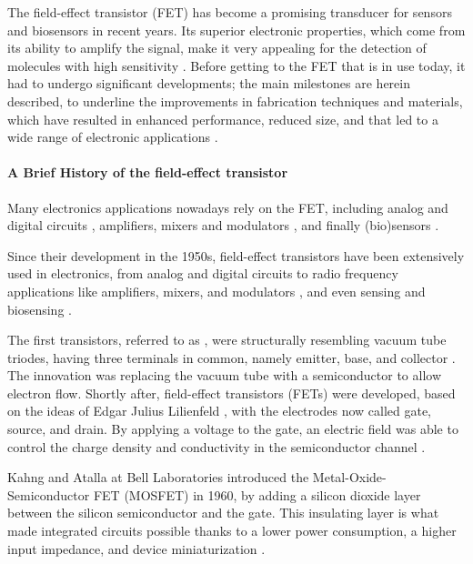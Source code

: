 The field-effect transistor (FET) has become a promising transducer for sensors and biosensors in recent years. Its superior electronic properties, which come from its ability to amplify the signal, make it very appealing for the detection of molecules with high sensitivity \citep{xuFlexible2022, yuRecent2024}. Before getting to the FET that is in use today, it had to undergo significant developments; the main milestones are herein described, to underline the improvements in fabrication techniques and materials, which have resulted in enhanced performance, reduced size, and that led to a wide range of electronic applications \citep{ahmadEvolution2021,tanAdvancements2024}.

\paragraph{A Brief History of the field-effect transistor}
Many electronics applications nowadays rely on the FET, including analog and digital circuits \citep{kimIntegrated2011, fortunatoOxide2012, yanRecent2022}, amplifiers, mixers and modulators \citep{torricelliIntegrated2021, yanRecent2022, pasadasExploiting2023}, and finally (bio)sensors \citep{shkodraElectrolytegated2021, dengSensors2022}.


Since their development in the 1950s, field-effect transistors have been extensively used in electronics, from analog and digital circuits \citep{kimIntegrated2011, fortunatoOxide2012, yanRecent2022} to radio frequency applications like amplifiers, mixers, and modulators \citep{torricelliIntegrated2021, yanRecent2022, pasadasExploiting2023}, and even sensing and biosensing \citep{shkodraElectrolytegated2021, dengSensors2022}.

The first transistors, referred to as , were structurally resembling vacuum tube triodes, having three terminals in common, namely emitter, base, and collector \citep{bardeenTransistor1948}. The innovation was replacing the vacuum tube with a semiconductor to allow electron flow. Shortly after, field-effect transistors (FETs) were developed, based on the ideas of Edgar Julius Lilienfeld \citep{edgarDevice1933, edgarMethod1930}, with the electrodes now called gate, source, and drain. By applying a voltage to the gate, an electric field was able to control the charge density and conductivity in the semiconductor channel \citep{shockleyUnipolar1952}.

Kahng and Atalla at Bell Laboratories introduced the Metal-Oxide-Semiconductor FET (MOSFET) in 1960, by adding a silicon dioxide layer between the silicon semiconductor and the gate. This insulating layer is what made integrated circuits possible thanks to a lower power consumption, a higher input impedance, and device miniaturization \citep{kahngSiliconSilicon1960,atallaNew1962,kilbyMiniaturized1964}.

